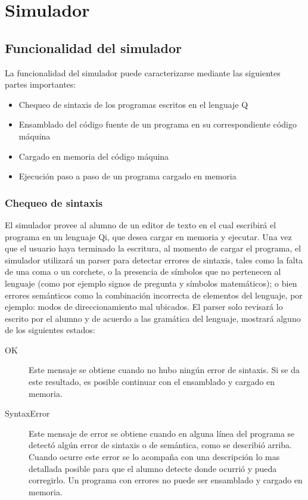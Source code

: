 \chapter{Simulador \qsim}


\section{Funcionalidad del simulador}

La funcionalidad del simulador puede caracterizarse mediante las siguientes partes importantes:

\begin{itemize}
\item Chequeo de sintaxis de los programas escritos en el lenguaje Q
\item Ensamblado del código fuente de un programa en su correspondiente código máquina
\item Cargado en memoria del código máquina
\item Ejecución paso a paso de un programa cargado en memoria
\end{itemize}

\subsection{Chequeo de sintaxis}

El simulador provee al alumno de un editor de texto en el cual escribirá el programa en un lenguaje Qi, que desea cargar en memoria y ejecutar.
Una vez que el usuario haya terminado la escritura, al momento de cargar el programa, el simulador utilizará un parser para detectar errores de sintaxis, tales como la falta de una coma o un corchete, o la presencia de símbolos que no pertenecen al lenguaje (como por ejemplo signos de pregunta y símbolos matemáticos); o bien errores semánticos como la combinación incorrecta de elementos del lenguaje, por ejemplo: modos de direccionamiento mal ubicados.
El parser solo revisará lo escrito por el alumno y de acuerdo a las gramática del lenguaje, mostrará alguno de los siguientes estados:

\begin{description}
\item[OK] Este mensaje se obtiene cuando no hubo ningún error de sintaxis. Si se da este resultado, es posible continuar con el ensamblado y cargado en memoria.
\item[SyntaxError] Este mensaje de error se obtiene cuando en alguna línea del programa se detectó algún error de sintaxis o de semántica, como se describió arriba. Cuando ocurre este error se lo acompaña con una descripción lo mas detallada posible para que el alumno detecte donde ocurrió y pueda corregirlo. Un programa con errores no puede ser ensamblado y cargado en memoria.
\end{description}

